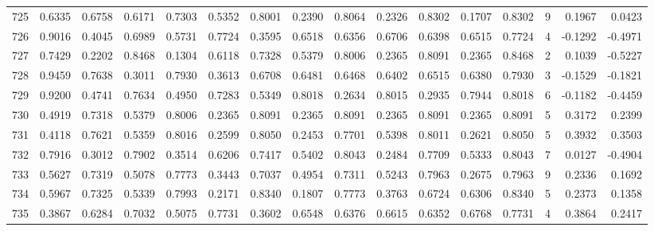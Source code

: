 \begin{tabular}{lrrrrrrrrrrrrrrr}
725 &      0.6335 &  0.6758 &  0.6171 &  0.7303 &  0.5352 &  0.8001 &  0.2390 &  0.8064 &  0.2326 &  0.8302 &   0.1707 &     0.8302 &      9 &                    0.1967 &                     0.0423 \\
726 &      0.9016 &  0.4045 &  0.6989 &  0.5731 &  0.7724 &  0.3595 &  0.6518 &  0.6356 &  0.6706 &  0.6398 &   0.6515 &     0.7724 &      4 &                   -0.1292 &                    -0.4971 \\
727 &      0.7429 &  0.2202 &  0.8468 &  0.1304 &  0.6118 &  0.7328 &  0.5379 &  0.8006 &  0.2365 &  0.8091 &   0.2365 &     0.8468 &      2 &                    0.1039 &                    -0.5227 \\
728 &      0.9459 &  0.7638 &  0.3011 &  0.7930 &  0.3613 &  0.6708 &  0.6481 &  0.6468 &  0.6402 &  0.6515 &   0.6380 &     0.7930 &      3 &                   -0.1529 &                    -0.1821 \\
729 &      0.9200 &  0.4741 &  0.7634 &  0.4950 &  0.7283 &  0.5349 &  0.8018 &  0.2634 &  0.8015 &  0.2935 &   0.7944 &     0.8018 &      6 &                   -0.1182 &                    -0.4459 \\
730 &      0.4919 &  0.7318 &  0.5379 &  0.8006 &  0.2365 &  0.8091 &  0.2365 &  0.8091 &  0.2365 &  0.8091 &   0.2365 &     0.8091 &      5 &                    0.3172 &                     0.2399 \\
731 &      0.4118 &  0.7621 &  0.5359 &  0.8016 &  0.2599 &  0.8050 &  0.2453 &  0.7701 &  0.5398 &  0.8011 &   0.2621 &     0.8050 &      5 &                    0.3932 &                     0.3503 \\
732 &      0.7916 &  0.3012 &  0.7902 &  0.3514 &  0.6206 &  0.7417 &  0.5402 &  0.8043 &  0.2484 &  0.7709 &   0.5333 &     0.8043 &      7 &                    0.0127 &                    -0.4904 \\
733 &      0.5627 &  0.7319 &  0.5078 &  0.7773 &  0.3443 &  0.7037 &  0.4954 &  0.7311 &  0.5243 &  0.7963 &   0.2675 &     0.7963 &      9 &                    0.2336 &                     0.1692 \\
734 &      0.5967 &  0.7325 &  0.5339 &  0.7993 &  0.2171 &  0.8340 &  0.1807 &  0.7773 &  0.3763 &  0.6724 &   0.6306 &     0.8340 &      5 &                    0.2373 &                     0.1358 \\
735 &      0.3867 &  0.6284 &  0.7032 &  0.5075 &  0.7731 &  0.3602 &  0.6548 &  0.6376 &  0.6615 &  0.6352 &   0.6768 &     0.7731 &      4 &                    0.3864 &                     0.2417 \\

\end{tabular}
